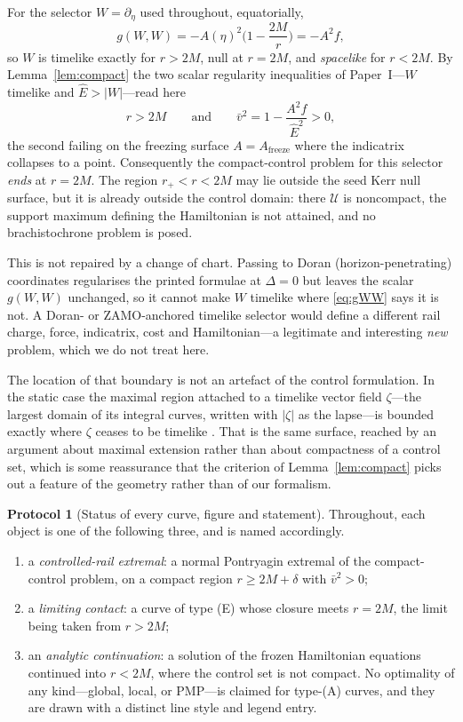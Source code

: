 \documentclass[12pt]{iopart}
\theoremstyle{plain}
\theoremstyle{definition}
\newtheorem{protocol}{Protocol}
\theoremstyle{remark}
\newcommand{\Ehat}{\hat E}
\newcommand{\rp}{r_{+}}
\newcommand{\Af}{A_{\mathrm{freeze}}}
\begin{document}
For the selector $W=\partial_\eta$ used throughout, equatorially,
\begin{equation}
    g(W,W)=-A(\eta)^2\Big(1-\frac{2M}{r}\Big)=-A^2f ,
    \label{eq:gWW}
\end{equation}
so $W$ is timelike exactly for $r>2M$, null at $r=2M$, and \emph{spacelike} for
$r<2M$. By Lemma~\ref{lem:compact} the two scalar regularity inequalities of
Paper~I---$W$ timelike and $\Ehat>|W|$---read here
\begin{equation}
    r>2M
    \qquad\text{and}\qquad
    \bar v^2=1-\frac{A^2f}{\Ehat^2}>0 ,
    \label{eq:two-inequalities}
\end{equation}
the second failing on the freezing surface $A=\Af$ where the indicatrix collapses
to a point. Consequently the compact-control problem for this selector
\emph{ends} at $r=2M$. The region $\rp<r<2M$ may lie outside the seed Kerr null
surface, but it is already outside the control domain: there $\mathcal U$ is
noncompact, the support maximum defining the Hamiltonian is not attained, and no
brachistochrone problem is posed.

This is not repaired by a change of chart. Passing to Doran
(horizon-penetrating) coordinates regularises the printed formulae at $\Delta=0$
but leaves the scalar $g(W,W)$ unchanged, so it cannot make $W$ timelike where
\eqref{eq:gWW} says it is not. A Doran- or ZAMO-anchored timelike selector would
define a different rail charge, force, indicatrix, cost and Hamiltonian---a
legitimate and interesting \emph{new} problem, which we do not treat here.

The location of that boundary is not an artefact of the control formulation. In
the static case the maximal region attached to a timelike vector field
$\zeta$---the largest domain of its integral curves, written with $|\zeta|$ as
the lapse---is bounded exactly where $\zeta$ ceases to be timelike
\cite{Lecian2025Cauchy}. That is the same surface, reached by an argument about
maximal extension rather than about compactness of a control set, which is some
reassurance that the criterion of Lemma~\ref{lem:compact} picks out a feature of
the geometry rather than of our formalism.

\begin{protocol}[Status of every curve, figure and statement]
\label{prot:status}
Throughout, each object is one of the following three, and is named accordingly.
\begin{enumerate}
\item[\rm(E)] a \emph{controlled-rail extremal}: a normal Pontryagin extremal of
the compact-control problem, on a compact region $r\ge2M+\delta$ with
$\bar v^2>0$;
\item[\rm(C)] a \emph{limiting contact}: a curve of type (E) whose closure meets
$r=2M$, the limit being taken from $r>2M$;
\item[\rm(A)] an \emph{analytic continuation}: a solution of the frozen
Hamiltonian equations continued into $r<2M$, where the control set is not
compact. No optimality of any kind---global, local, or PMP---is claimed for
type-(A) curves, and they are drawn with a distinct line style and legend entry.
\end{enumerate}
\end{protocol}
\end{document}
